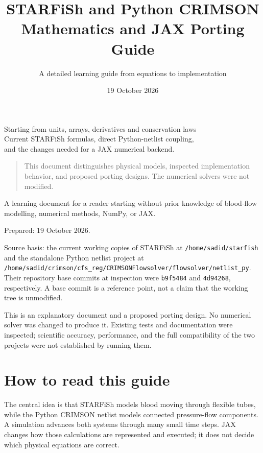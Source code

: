 \documentclass[11pt,a4paper]{article}
\title{\color{navy}\Huge STARFiSh and Python CRIMSON\\[8pt]
 \Large Mathematics and JAX Porting Guide}
\author{A detailed learning guide from equations to implementation}
\date{19 October 2026}
\begin{document}
\maketitle
\vspace{12pt}
\begin{center}
\large Starting from units, arrays, derivatives and conservation laws\\[5pt]
\normalsize Current STARFiSh formulas, direct Python-netlist coupling,\\
and the changes needed for a JAX numerical backend.
\end{center}
\vfill
\begin{quote}
This document distinguishes physical models, inspected implementation behavior,
and proposed porting designs. The numerical solvers were not modified.
\end{quote}
\clearpage
\tableofcontents
\clearpage
A learning document for a reader starting without prior knowledge of blood-flow modelling, numerical methods, NumPy, or JAX.

Prepared: 19 October 2026.

Source basis: the current working copies of STARFiSh at \texttt{/\allowbreak{}home/\allowbreak{}sadid/\allowbreak{}starfish} and the standalone Python netlist project at \texttt{/\allowbreak{}home/\allowbreak{}sadid/\allowbreak{}crimson/\allowbreak{}cfs\_\allowbreak{}reg/\allowbreak{}CRIMSONFlowsolver/\allowbreak{}flowsolver/\allowbreak{}netlist\_\allowbreak{}py}. Their repository base commits at inspection were \texttt{b9f5484} and \texttt{4d94268}, respectively. A base commit is a reference point, not a claim that the working tree is unmodified.

This is an explanatory document and a proposed porting design. No numerical solver was changed to produce it. Existing tests and documentation were inspected; scientific accuracy, performance, and the full compatibility of the two projects were not established by running them.

\clearpage
\section{How to read this guide}
The central idea is that STARFiSh models blood moving through flexible tubes, while the Python CRIMSON netlist models connected pressure-flow components. A simulation advances both systems through many small time steps. JAX changes how those calculations are represented and executed; it does not decide which physical equations are correct.
\end{document}
